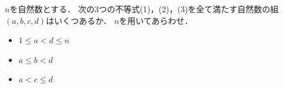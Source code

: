 \documentclass[../../main.tex]{subfiles}
\begin{document}
$n$を自然数とする．
次の3つの不等式(1)，(2)，(3)を全て満たす自然数の組$(a,b,c,d)$はいくつあるか．
$n$を用いてあらわせ．
\begin{itemize}
  \item[(1)] $1\le a < d \le n$
  \item[(2)] $a\le b < d$
  \item[(3)] $a<c\le d$
\end{itemize}
\end{document}
